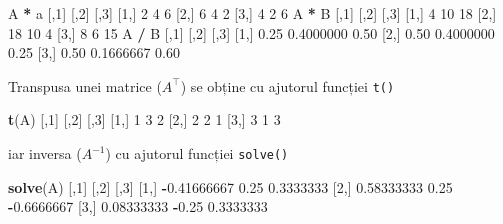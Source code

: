 \documentclass[]{article}
\newenvironment{Shaded}{\begin{snugshade}}{\end{snugshade}}
\newcommand{\KeywordTok}[1]{\textcolor[rgb]{0.13,0.29,0.53}{\textbf{#1}}}
\newcommand{\DecValTok}[1]{\textcolor[rgb]{0.00,0.00,0.81}{#1}}
\newcommand{\FloatTok}[1]{\textcolor[rgb]{0.00,0.00,0.81}{#1}}
\newcommand{\StringTok}[1]{\textcolor[rgb]{0.31,0.60,0.02}{#1}}
\newcommand{\OperatorTok}[1]{\textcolor[rgb]{0.81,0.36,0.00}{\textbf{#1}}}
\newcommand{\NormalTok}[1]{#1}
\begin{document}
\begin{Shaded}
\begin{Highlighting}[]
\NormalTok{A }\OperatorTok{*}\StringTok{ }\NormalTok{a}
\NormalTok{     [,}\DecValTok{1}\NormalTok{] [,}\DecValTok{2}\NormalTok{] [,}\DecValTok{3}\NormalTok{]}
\NormalTok{[}\DecValTok{1}\NormalTok{,]    }\DecValTok{2}    \DecValTok{4}    \DecValTok{6}
\NormalTok{[}\DecValTok{2}\NormalTok{,]    }\DecValTok{6}    \DecValTok{4}    \DecValTok{2}
\NormalTok{[}\DecValTok{3}\NormalTok{,]    }\DecValTok{4}    \DecValTok{2}    \DecValTok{6}
\NormalTok{A }\OperatorTok{*}\StringTok{ }\NormalTok{B}
\NormalTok{     [,}\DecValTok{1}\NormalTok{] [,}\DecValTok{2}\NormalTok{] [,}\DecValTok{3}\NormalTok{]}
\NormalTok{[}\DecValTok{1}\NormalTok{,]    }\DecValTok{4}   \DecValTok{10}   \DecValTok{18}
\NormalTok{[}\DecValTok{2}\NormalTok{,]   }\DecValTok{18}   \DecValTok{10}    \DecValTok{4}
\NormalTok{[}\DecValTok{3}\NormalTok{,]    }\DecValTok{8}    \DecValTok{6}   \DecValTok{15}
\NormalTok{A }\OperatorTok{/}\StringTok{ }\NormalTok{B}
\NormalTok{     [,}\DecValTok{1}\NormalTok{]      [,}\DecValTok{2}\NormalTok{] [,}\DecValTok{3}\NormalTok{]}
\NormalTok{[}\DecValTok{1}\NormalTok{,] }\FloatTok{0.25} \FloatTok{0.4000000} \FloatTok{0.50}
\NormalTok{[}\DecValTok{2}\NormalTok{,] }\FloatTok{0.50} \FloatTok{0.4000000} \FloatTok{0.25}
\NormalTok{[}\DecValTok{3}\NormalTok{,] }\FloatTok{0.50} \FloatTok{0.1666667} \FloatTok{0.60}
\end{Highlighting}
\end{Shaded}

Transpusa unei matrice (\(A^\intercal\)) se obține cu ajutorul funcției
\texttt{t()}

\begin{Shaded}
\begin{Highlighting}[]
\KeywordTok{t}\NormalTok{(A)}
\NormalTok{     [,}\DecValTok{1}\NormalTok{] [,}\DecValTok{2}\NormalTok{] [,}\DecValTok{3}\NormalTok{]}
\NormalTok{[}\DecValTok{1}\NormalTok{,]    }\DecValTok{1}    \DecValTok{3}    \DecValTok{2}
\NormalTok{[}\DecValTok{2}\NormalTok{,]    }\DecValTok{2}    \DecValTok{2}    \DecValTok{1}
\NormalTok{[}\DecValTok{3}\NormalTok{,]    }\DecValTok{3}    \DecValTok{1}    \DecValTok{3}
\end{Highlighting}
\end{Shaded}

iar inversa (\(A^{-1}\)) cu ajutorul funcției \texttt{solve()}

\begin{Shaded}
\begin{Highlighting}[]
\KeywordTok{solve}\NormalTok{(A)}
\NormalTok{            [,}\DecValTok{1}\NormalTok{]  [,}\DecValTok{2}\NormalTok{]       [,}\DecValTok{3}\NormalTok{]}
\NormalTok{[}\DecValTok{1}\NormalTok{,] }\OperatorTok{-}\FloatTok{0.41666667}  \FloatTok{0.25}  \FloatTok{0.3333333}
\NormalTok{[}\DecValTok{2}\NormalTok{,]  }\FloatTok{0.58333333}  \FloatTok{0.25} \OperatorTok{-}\FloatTok{0.6666667}
\NormalTok{[}\DecValTok{3}\NormalTok{,]  }\FloatTok{0.08333333} \OperatorTok{-}\FloatTok{0.25}  \FloatTok{0.3333333}
\end{Highlighting}
\end{Shaded}
\end{document}
